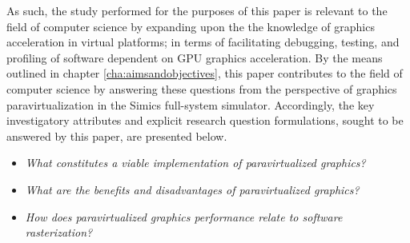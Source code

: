 As such, the study performed for the purposes of this paper is relevant to the field of computer science by expanding upon the the knowledge of graphics acceleration in virtual platforms; in terms of facilitating debugging, testing, and profiling of software dependent on GPU graphics acceleration.
By the means outlined in chapter \ref{cha:aimsandobjectives}, this paper contributes to the field of computer science by answering these questions from the perspective of graphics paravirtualization in the Simics full-system simulator.
Accordingly, the key investigatory attributes and explicit research question formulations, sought to be answered by this paper, are presented below.

\newcommand*\researchquestionitem[2]{\item[#1:] \textit{#2}}
\begin{itemize}[noitemsep]
	\researchquestionitem{1}{What constitutes a viable implementation of paravirtualized graphics?}
	\researchquestionitem{2}{What are the benefits and disadvantages of paravirtualized graphics?}
	\researchquestionitem{3}{How does paravirtualized graphics performance relate to software rasterization?}
\end{itemize}
